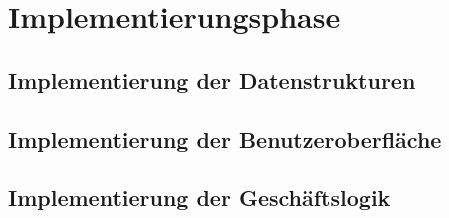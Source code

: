 \section{Implementierungsphase}
\blindtext
\subsection{Implementierung der Datenstrukturen}
\subsection{Implementierung der Benutzeroberfläche}
\subsection{Implementierung der Geschäftslogik}